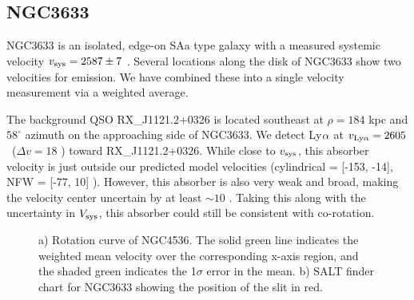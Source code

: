 \subsection{NGC3633}
NGC3633 is an isolated, edge-on SAa type galaxy with a measured systemic velocity $v_{\rm sys} = 2587 \pm 7$ \kms. Several locations along the disk of NGC3633 show two velocities for emission. We have combined these into a single velocity measurement via a weighted average. 

The background QSO RX\_J1121.2+0326 is located southeast at $\rho = 184$ kpc and $58^{\circ}$ azimuth on the approaching side of NGC3633. We detect Ly$\rm \alpha$ at $v_{\rm Ly\alpha} = 2605$ \kms~($\Delta v = 18$ \kms) toward RX\_J1121.2+0326. While close to $v_{\rm sys}$, this absorber velocity is just outside our predicted model velocities (cylindrical = [-153, -14], NFW = [-77, 10] \kms). However, this absorber is also very weak and broad, making the velocity center uncertain by at least $\sim 10$ \kms. Taking this along with the uncertainty in $V_{\rm sys}$, this absorber could still be consistent with co-rotation.

\begin{figure}[ht]
\centering
  \caption{\small{a) Rotation curve of NGC4536. The solid green line indicates the weighted mean velocity over the corresponding x-axis region, and the shaded green indicates the 1$\sigma$ error in the mean. b) SALT finder chart for NGC3633 showing the position of the slit in red.}}
\vspace{0pt}
\end{figure}



